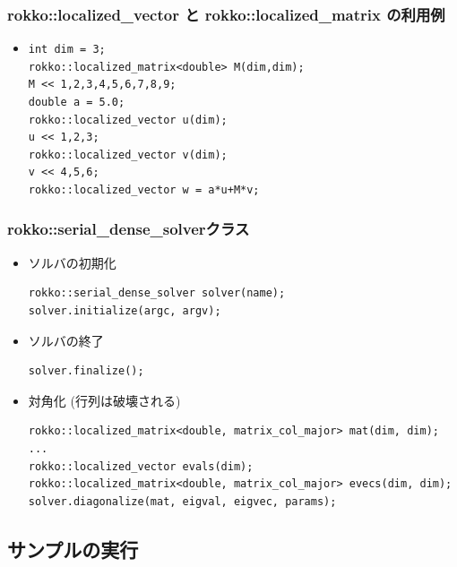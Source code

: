 \begin{frame}[c,fragile]
  \frametitle{rokko::localized\_vector と rokko::localized\_matrix の利用例}
  \begin{itemize}
  \item {}
\begin{lstlisting}
int dim = 3;
rokko::localized_matrix<double> M(dim,dim);
M << 1,2,3,4,5,6,7,8,9;
double a = 5.0;
rokko::localized_vector u(dim);
u << 1,2,3;
rokko::localized_vector v(dim);
v << 4,5,6;
rokko::localized_vector w = a*u+M*v;
\end{lstlisting}
  \end{itemize}
\end{frame}

\begin{frame}[c,fragile]
  \frametitle{rokko::serial_dense_solverクラス}
  \begin{itemize}
  \item ソルバの初期化
\begin{lstlisting}
rokko::serial_dense_solver solver(name);
solver.initialize(argc, argv);
\end{lstlisting}
  \item ソルバの終了
\begin{lstlisting}
solver.finalize();
\end{lstlisting}
  \item 対角化 (行列は破壊される)
\begin{lstlisting}
rokko::localized_matrix<double, matrix_col_major> mat(dim, dim);
...
rokko::localized_vector evals(dim);
rokko::localized_matrix<double, matrix_col_major> evecs(dim, dim);
solver.diagonalize(mat, eigval, eigvec, params);
\end{lstlisting}
  \end{itemize}
\end{frame}

\subsection*{サンプルの実行}

